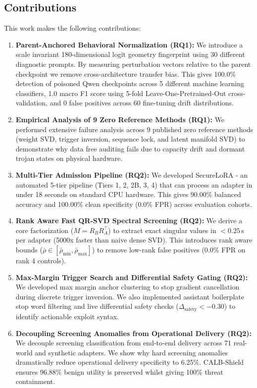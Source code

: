 \documentclass[conference]{IEEEtran}
\begin{document}
\subsection{Contributions}
This work makes the following contributions:
\begin{enumerate}
    \item \textbf{Parent-Anchored Behavioral Normalization (RQ1):} We introduce a scale invariant 180-dimensional logit geometry fingerprint using 30 different diagnostic prompts. By measuring perturbation vectors relative to the parent checkpoint we remove cross-architecture transfer bias. This gives 100.0\% detection of poisoned Qwen checkpoints across 5 different machine learning classifiers, 1.0 macro F1 score using 5-fold Leave-One-Pretrained-Out cross-validation, and 0 false positives across 60 fine-tuning drift distributions.
    \item \textbf{Empirical Analysis of 9 Zero Reference Methods (RQ1):} We performed extensive failure analysis across 9 published zero reference methods (weight SVD, trigger inversion, sequence lock, and latent manifold SVD) to demonstrate why data free auditing fails due to capacity drift and dormant trojan states on physical hardware.
    \item \textbf{Multi-Tier Admission Pipeline (RQ2):} We developed SecureLoRA - an automated 5-tier pipeline (Tiers 1, 2, 2B, 3, 4) that can process an adapter in under 18 seconds on standard CPU hardware. This gives 90.00\% balanced accuracy and 100.00\% clean specificity (0.0\% FPR) across evaluation cohorts.
    \item \textbf{Rank Aware Fast QR-SVD Spectral Screening (RQ2):} We derive a core factorization ($M = R_B R_A^\top$) to extract exact singular values in $< 0.25$\,s per adapter (5000x faster than naive dense SVD). This introduces rank aware bounds ($\bar{\rho} \in [\bar{\rho}_{\min}, \bar{\rho}_{\max}]$) to remove low-rank false positives (0.0\% FPR on rank 4 controls).
    \item \textbf{Max-Margin Trigger Search and Differential Safety Gating (RQ2):} We developed max margin anchor clustering to stop gradient cancellation during discrete trigger inversion. We also implemented assistant boilerplate stop word filtering and live differential safety checks ($\Delta_{\text{safety}} < -0.30$) to identify actionable exploit syntax.
    \item \textbf{Decoupling Screening Anomalies from Operational Delivery (RQ2):} We decouple screening classification from end-to-end delivery across 71 real-world and synthetic adapters. We show why hard screening anomalies dramatically reduce operational delivery specificity to 6.25\%. CALB-Shield ensures 96.88\% benign utility is preserved whilst giving 100\% threat containment.

\end{enumerate}
\end{document}
